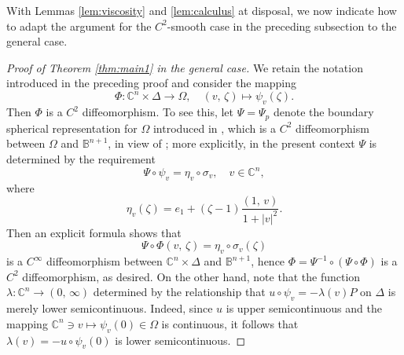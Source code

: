 \documentclass[12pt,a4paper]{amsart}
\numberwithin{equation}{section}
\theoremstyle{definition}
\begin{document}
With Lemmas \ref{lem:viscosity} and \ref{lem:calculus} at disposal, we now indicate how to adapt the argument for the $C^2$-smooth case in the preceding subsection to the general case.

\begin{proof}[Proof of Theorem \ref{thm:main1} in the general case]
We retain the notation introduced in the preceding proof and consider the mapping
\[
\Phi\!:\mathbb{C}^n\times\Delta\rightarrow\Omega, \quad (v,\, \zeta) \mapsto \psi_v(\zeta).
\]
Then $\Phi$ is a $C^2$ diffeomorphism. To see this, let $\Psi=\Psi_p$ denote the boundary spherical representation for $\Omega$ introduced in \cite{Huang-Wang22}, which is a  $C^2$ diffeomorphism between $\Omega$ and $\mathbb{B}^{n+1}$, in view of \cite[Theorem C]{Wang24}; more explicitly, in the present context $\Psi$ is determined by the requirement
\[
\Psi\circ\psi_v=\eta_v\circ\sigma_v, \quad v\in\mathbb{C}^n,
\]
where
\[
\eta_v(\zeta)=e_1+(\zeta-1)\frac{(1,\, v)}{1+|v|^2}.
\]
Then an explicit formula shows that
\[
\Psi\circ\Phi(v,\, \zeta)=\eta_v\circ\sigma_v(\zeta)
\]
is a $C^\infty$ diffeomorphism between $\mathbb{C}^n\times\Delta$ and $\mathbb{B}^{n+1}$, hence $\Phi=\Psi^{-1}\circ(\Psi\circ\Phi)$ is a $C^2$ diffeomorphism, as desired.
On the other hand, note that the function $\lambda\!:\mathbb{C}^n\to (0,\, \infty)$ determined by the relationship that $u\circ\psi_v=-\lambda(v)P$ on $\Delta$ is merely lower semicontinuous. Indeed, since $u$ is upper semicontinuous and the mapping $\mathbb{C}^n\ni v\mapsto\psi_v(0)\in \Omega$ is continuous, it follows that $\lambda(v)=-u\circ\psi_v(0)$ is lower semicontinuous.


\end{proof}
\end{document}
